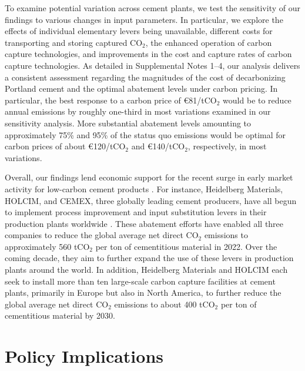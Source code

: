 \documentclass[12pt, a4paper]{article} %
\newcommand{\Suppl}{Supplemental}
\begin{document}
To examine potential variation across cement plants, we test the sensitivity of our findings to various changes in input parameters. In particular, we explore the effects of individual elementary levers being unavailable, different costs for transporting and storing captured CO$_2$, the enhanced operation of carbon capture technologies, and improvements in the cost and capture rates of carbon capture technologies. As detailed in \Suppl$ $ Notes 1--4, our analysis delivers a consistent assessment regarding the magnitudes of the cost of decarbonizing Portland cement and the optimal abatement levels under carbon pricing. In particular, the best response to a carbon price of \euro 81/tCO$_2$ would be to reduce annual emissions by roughly one-third in most variations examined in our sensitivity analysis. More substantial abatement levels amounting to approximately 75\% and 95\% of the status quo emissions would be optimal for carbon prices of about \euro 120/tCO$_2$ and \euro 140/tCO$_2$, respectively, in most variations.

Overall, our findings lend economic support for the recent surge in early market activity for low-carbon cement products \citep{research2022global,george2022report,fennell2022going,hm2023heidelberg}. For instance, Heidelberg Materials, HOLCIM, and CEMEX, three globally leading cement producers, have all begun to implement process improvement and input substitution levers in their production plants worldwide \citep{hm2023annual,holcim2023decarbonizing,cemex2023integrated}. These abatement efforts have enabled all three companies to reduce the global average net direct CO$_2$ emissions to approximately 560 tCO$_2$ per ton of cementitious material in 2022. Over the coming decade, they aim to further expand the use of these levers in production plants around the world. In addition, Heidelberg Materials and HOLCIM each seek to install more than ten large-scale carbon capture facilities at cement plants, primarily in Europe but also in North America, to further reduce the global average net direct CO$_2$ emissions to about 400 tCO$_2$ per ton of cementitious material by 2030.


\section{Policy Implications}
\label{sec: policy}
\end{document}
